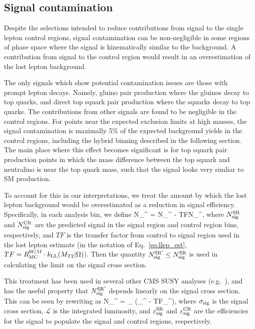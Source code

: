 \subsection{Signal contamination}
Despite the selections intended to reduce contributions from signal to the single lepton control
regions, signal contamination can be non-negligible in some regions of phase space where the
signal is kinematically similar to the background. A contribution from signal to the control
region would result in an overestimation of the lost lepton background.

The only signals which show potential contamination issues are those with prompt lepton decays. 
Namely, gluino pair production where the gluinos decay to top quarks, and direct top squark pair production where the squarks decay to top quarks. 
The contributions from other signals are found to be negligible in the control
regions. For points near the expected exclusion limits at high masses, the signal contamination
is maximally 5\% of the expected background yields in the control regions, including the hybrid \mttwo binning described in the following section. 
The main place where this effect becomes significant is for top squark pair production points
in which the mass difference between the top squark and neutralino is near the top quark mass, such that the
signal looks very simliar to SM \ttbar production.

To account for this in our interpretations, we treat the amount by which the lost lepton background 
would be overestimated as a reduction in signal efficiency. Specifically, in each analysis bin, we define
\be
N_^ = N_^ - TF\cdot N_^,
\ee
where $N_{\mathrm{sig}}^{\mathrm{SR}}$ and $N_{\mathrm{sig}}^{\mathrm{CR}}$ are the predicted signal in the signal region and control region bins,
respectively, and $TF$ is the transfer factor from control to signal region used in the lost lepton estimate (in
the notation of Eq.~\ref{eq:llep_est}, $TF=R_{\mathrm{MC}}^{0\ell/1\ell}\cdot k_{\mathrm{LL}}(M_{\mathrm{T2}}|\Omega)$).
Then the quantity $N_{\mathrm{sig}}^{\mathrm{SR'}}\leq N_{\mathrm{sig}}^{\mathrm{SR}}$ is used in calculating the limit on the
signal cross section.

This treatment has been used in several other CMS SUSY analyses (e.g.~\cite{SUS_stop1l}),
and has the useful property that $N_{\mathrm{sig}}^{\mathrm{SR'}}$ depends linearly on the signal cross section. 
This can be seen by rewriting as
\be
N_^ = \sigma_\cdot{}\cdot
(\varepsilon_^ - TF\cdot\varepsilon_^),
\ee
where $\sigma_{\mathrm{sig}}$ is the signal cross section, $\mathcal{L}$ is the integrated luminosity, and
$\varepsilon_{\mathrm{sig}}^{\mathrm{SR}}$ and $\varepsilon_{\mathrm{sig}}^{\mathrm{CR}}$ are the efficiencies for the signal to
populate the signal and control regions, respectively.

